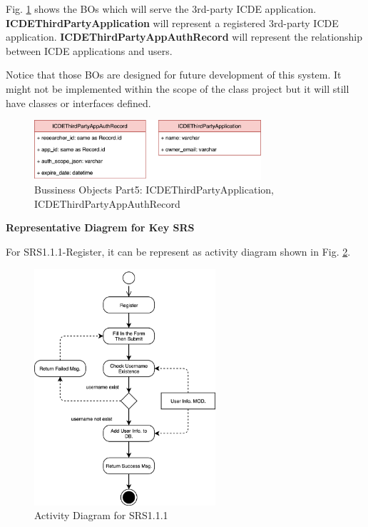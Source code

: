 Fig. \ref{fig:bo_classes_6} shows the BOs which will serve the 3rd-party ICDE application. 
\textbf{ICDEThirdPartyApplication} will represent a registered 3rd-party ICDE application.
\textbf{ICDEThirdPartyAppAuthRecord} will represent the relationship between ICDE applications and users.

Notice that those BOs are designed for future development of this system. It might not be implemented within the scope of the class project but it will still have classes or interfaces defined.

\begin{figure}[t]
	\centering
	\includegraphics[width=0.75\textwidth]{./img/bo_classes_6.png}
	\caption{Bussiness Objects Part5: ICDEThirdPartyApplication, ICDEThirdPartyAppAuthRecord}
	
	\label{fig:bo_classes_6}
\end{figure}

\textbf{Representative Diagrem for Key SRS}

For SRS1.1.1-Register, it can be represent as activity diagram shown in Fig. \ref{fig:srs_diagram_1}.

\begin{figure}[t]
	\centering
	\includegraphics[width=0.6\textwidth]{./img/srs_diagram_1.png}
	\caption{Activity Diagram for SRS1.1.1}
	
	\label{fig:srs_diagram_1}
\end{figure}

